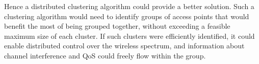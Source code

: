 Hence a distributed clustering algorithm could provide a better solution. Such a clustering algorithm would need to identify groups of access points
that would benefit the most of being grouped together, without exceeding a feasible maximum size of each cluster. If such clusters were efficiently identified,
it could enable distributed control over the wireless spectrum, and information about channel interference and QoS could freely flow within the group. 








